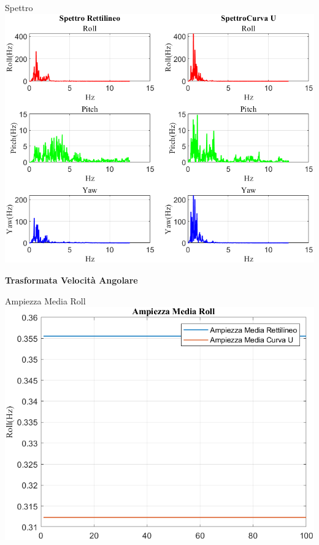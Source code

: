 \documentclass[beamer]{standalone}
\begin{document}
	\begin{frame}{{Spettro}}
		\centering\includegraphics[height=.8\textheight]{figure/VAng/Trasformata/Spettro}
	\end{frame}
	
	\begin{frame}
		\color{blue}\centering\huge{\textbf{Trasformata Velocità Angolare}}
	\end{frame}
	
	\begin{frame}{{Ampiezza Media Roll}}					
		\centering\includegraphics[height=.8\textheight]{figure/VAng/Trasformata/Ampiezza MediaRoll}
	\end{frame}
	
\end{document}
